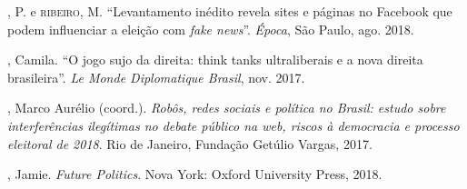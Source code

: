 \begin{bibliohedra}
, P. e \textsc{ribeiro}, M. ``Levantamento inédito revela sites e páginas
no Facebook que podem influenciar a eleição com \textit{fake news}''. \textit{Época},
São Paulo, ago. 2018.

, Camila. ``O jogo sujo da direita: think tanks ultraliberais e a
nova direita brasileira''. \textit{Le Monde Diplomatique Brasil}, nov. 2017. 

, Marco Aurélio (coord.). \textit{Robôs, redes sociais e política no Brasil: estudo sobre interferências ilegítimas no debate público na web, riscos à democracia
e processo eleitoral de 2018}. Rio de Janeiro, Fundação Getúlio Vargas, 2017.

, Jamie. \textit{Future Politics}. Nova York: Oxford University
Press, 2018.
\end{bibliohedra}


\begin{flushright}
\end{flushright}


